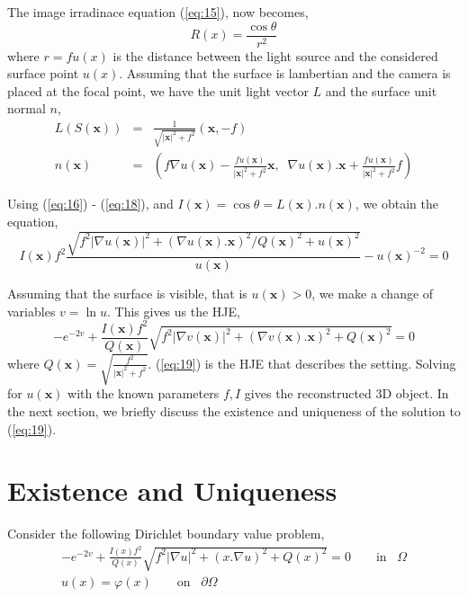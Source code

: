 \noindent
The image irradinace equation (\ref{eq:15}), now becomes,
\begin{equation}
  R(x) = \frac{\cos \theta}{r^2}\label{eq:16}
\end{equation}
where $r = fu(x)$ is the distance between the light source and the considered
surface point $u(x)$. Assuming that the surface is lambertian and the camera is placed at the focal point, we have the unit light vector $L$ and the
surface unit normal $n$,
\begin{eqnarray}
  L(S(\mathbf{x})) &=& \frac{1}{\sqrt{\lvert \mathbf{x} \rvert^2+f^2}} (\mathbf{x},-f)\label{eq:17}\\
  n(\mathbf{x}) &=& \left( f\nabla u(\mathbf{x}) -
  \frac{fu(\mathbf{x})}{\lvert \mathbf{x} \rvert^2 + f^2} \mathbf{x},\;\;
  \nabla u(\mathbf{x}).\mathbf{x} + \frac{f u(\mathbf{x})}{\lvert
  \mathbf{x} \rvert^2 + f^2} f\right)\label{eq:18}
\end{eqnarray}

\noindent
Using (\ref{eq:16}) - (\ref{eq:18}), and $I(\mathbf{x}) = \cos \theta = L(\mathbf{x}).n(\mathbf{x})$, we
obtain the equation,
\begin{equation}
  I(\mathbf{x})f^2 \frac{\sqrt{f^2|\nabla u(\mathbf{x})|^2 + (\nabla
      u(\mathbf{x}).\mathbf{x})^2/Q(\mathbf{x})^2 +
      u(\mathbf{x})^2}}{u(\mathbf{x})} - u(\mathbf{x})^{-2} = 0
\end{equation}

\noindent
Assuming that the surface is visible, that is $u(\mathbf{x}) > 0$, we
make a change of variables $v = \ln u$. This gives us the HJE,
\begin{equation}
  -e^{-2v} + \frac{I(\mathbf{x})f^2}{Q(\mathbf{x})} \sqrt{f^2 |\nabla
    v(\mathbf{x})|^2 + (\nabla v(\mathbf{x}). \mathbf{x})^2 +
    Q(\mathbf{x})^2} = 0 \label{eq:19}
\end{equation}
where $Q(\mathbf{x}) = \sqrt{\frac{f^2}{|\mathbf{x}|^2 +
    f^2}}$. (\ref{eq:19}) is the HJE that describes the
setting. Solving for $u(\mathbf{x})$ with the known parameters $f,I$
gives the reconstructed 3D object. In the next section, we briefly
discuss the existence and uniqueness of the solution to (\ref{eq:19}).

\section{Existence and Uniqueness}
Consider the following Dirichlet boundary value problem,
\begin{eqnarray}
  -e^{-2v} + \frac{I(x)f^2}{Q(x)} \sqrt{f^2|\nabla u|^2 + (x.\nabla
    u)^2 + Q(x)^2} = 0 \qquad \text{in} \;\;\; \Omega \label{eq:20}\\
  u(x) = \varphi(x) \qquad \text{on} \;\;\; \partial \Omega \label{eq:21}
\end{eqnarray}


